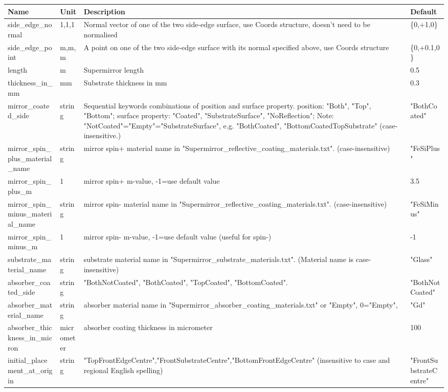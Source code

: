 \begin{longtable}{p{}p{}p{}p{}}
\toprule
\textbf{Name} & \textbf{Unit} & \textbf{Description} & \textbf{Default} \\
\midrule
\endhead
side\_edge\_normal & 1,1,1 & Normal vector of one of the two side-edge surface, use Coords structure, doesn't need to be normalised & \{0,+1,0\} \\
side\_edge\_point & m,m,m & A point on one of the two side-edge surface with its normal specified above, use Coords structure & \{0,+0.1,0\} \\
length & m & Supermirror length & 0.5 \\
thickness\_in\_mm & mm & Substrate thickness in mm & 0.3 \\
mirror\_coated\_side & string & Sequential keywords combinations of position and surface property. position: "Both", "Top", "Bottom"; surface property: "Coated", "SubstrateSurface", "NoReflection"; Note: "NotCoated"="Empty"="SubstrateSurface", e.g. "BothCoated", "BottomCoatedTopSubstrate" (case-insensitive.) & "BothCoated" \\
mirror\_spin\_plus\_material\_name & string & mirror spin+ material name in "Supermirror\_reflective\_coating\_materials.txt". (case-insensitive) & "FeSiPlus" \\
mirror\_spin\_plus\_m & 1 & mirror spin+ m-value, -1=use default value & 3.5 \\
mirror\_spin\_minus\_material\_name & string & mirror spin- material name in "Supermirror\_reflective\_coating\_materials.txt". (case-insensitive) & "FeSiMinus" \\
mirror\_spin\_minus\_m & 1 & mirror spin- m-value, -1=use default value (useful for spin-) & -1 \\
substrate\_material\_name & string & substrate material name in "Supermirror\_substrate\_materials.txt". (Material name is case-insensitive) & "Glass" \\
absorber\_coated\_side & string & "BothNotCoated", "BothCoated", "TopCoated", "BottomCoated". & "BothNotCoated" \\
absorber\_material\_name & string & absorber material name in "Supermirror\_absorber\_coating\_materials.txt" or "Empty", 0="Empty", & "Gd" \\
absorber\_thickness\_in\_micron & micrometer & absorber coating thickness in micrometer & 100 \\
initial\_placement\_at\_origin & string & "TopFrontEdgeCentre","FrontSubstrateCentre","BottomFrontEdgeCentre" (insensitive to case and regional English spelling) & "FrontSubstrateCentre" \\

\end{longtable}

